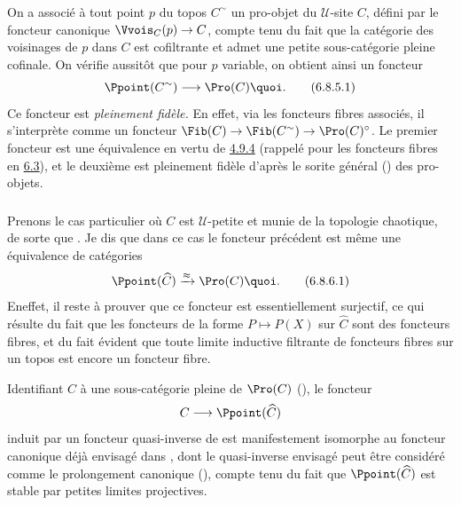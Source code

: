 \documentclass[10pt]{../fichiers-configuration-latex/smfart}
\begin{document}
\setcounter{subsubsection}{4}
\subsubsection{}
On a associé à tout point $p$ du topos $C^{\sim}$ un pro-objet du
$𝒰$-site $C$, défini par le foncteur canonique
$\Vvois_C(p)\rightarrow C$, compte tenu du fait que la catégorie des
voisinages de $p$ dans $C$ est cofiltrante et admet une petite
sous-catégorie pleine cofinale. On vérifie aussitôt que pour $p$
variable, on obtient ainsi un foncteur
\begin{equation*}
\Ppoint(C^{\sim})\longrightarrow \Pro(C){\quoi}.\tag{6.8.5.1}
\end{equation*}
Ce foncteur est \emph{pleinement fidèle.} En effet, via les
foncteurs fibres associés, il s'interprète comme un foncteur
$\Fib(C)\rightarrow \Fib(C^{\sim})\rightarrow \Pro(C)^{\circ}$. Le
premier foncteur est une équivalence en vertu de \hyperref[IV.prop4.9.4]{4.9.4}
(rappelé pour les foncteurs fibres en \hyperref[IV.subsec6.3]{6.3}), et le
deuxième est pleinement fidèle d'après le sorite général
() des pro-objets.

\subsubsection{}
Prenons le cas particulier où $C$ est $𝒰$-petite et munie de
la topologie chaotique, de sorte que . Je dis que
dans ce cas le foncteur précédent est même une équivalence de
catégories
\begin{equation*}
\Ppoint(\widehat{C})\xrightarrow{\approx}\Pro(C){\quoi}.\tag{6.8.6.1}
\end{equation*}
En\pageoriginale effet, il reste à prouver que ce foncteur est
essentiellement surjectif, ce qui résulte du fait que les foncteurs
de la forme $P\mapsto P(X)$ sur $\widehat{C}$ sont des foncteurs
fibres, et du fait évident que toute limite inductive filtrante de
foncteurs fibres sur un topos est encore un foncteur fibre.

Identifiant $C$ à une sous-catégorie pleine de $\Pro(C)$
(), le foncteur
$$
C\longrightarrow \Ppoint(\widehat{C})
$$
induit par un foncteur quasi-inverse de  est manifestement
isomorphe au foncteur canonique déjà envisagé dans
,
dont le quasi-inverse envisagé peut être considéré comme le
prolongement canonique (), compte tenu du fait que
$\Ppoint(\widehat{C})$ est stable par petites limites projectives.
\end{document}
